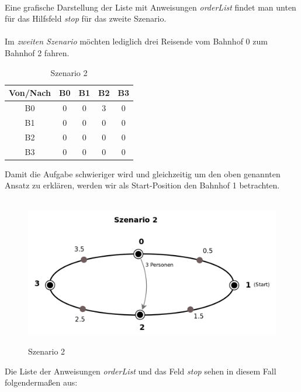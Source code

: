 \\
Eine grafische Darstellung der Liste mit Anweisungen \textit{orderList} findet man unten für das Hilfsfeld \textit{stop} für das zweite Szenario.\\
\\
Im \textit{zweiten Szenario} möchten lediglich drei Reisende vom Bahnhof 0 zum Bahnhof 2 fahren.\\
\begin{table}[H]
\caption{Szenario 2}
\center
 \begin{tabular}{|c|c|c|c|c|}
 \hline
  Von/Nach & B0 & B1 & B2 & B3 \\ \hline
  B0 & 0 & 0 & 3 & 0\\   \hline
    B1 & 0 & 0 & 0 & 0 \\   \hline
      B2 & 0 & 0 & 0 & 0\\   \hline
        B3 & 0 & 0 & 0 & 0 \\   \hline
 \end{tabular}
\end{table}
\noindent
Damit die Aufgabe schwieriger wird und gleichzeitig um den oben genannten Ansatz zu erklären, werden wir als Start-Position den Bahnhof 1 betrachten.\\
\\
\begin{figure}[H]	
\caption{Szenario 2}
\center
\includegraphics[width=2\textwidth, width=350pt]{content/images/szenario2.png}
\label{pic:szenario2}
\end{figure}
\noindent
Die Liste der Anweisungen \textit{orderList} und das Feld \textit{stop} sehen in diesem Fall folgendermaßen aus:\\
